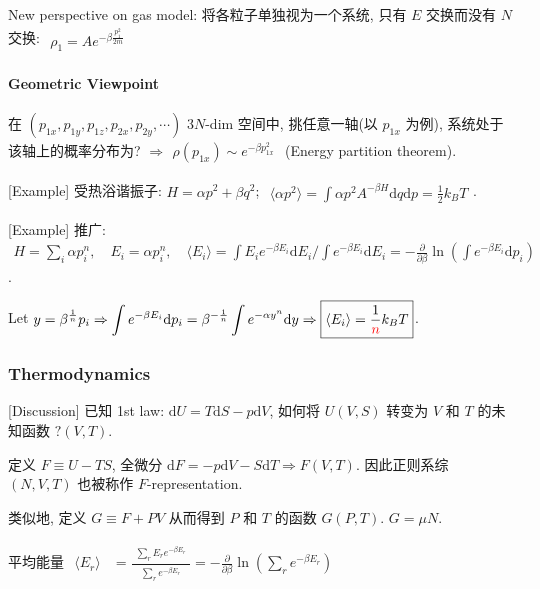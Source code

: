 \documentclass[../../main.tex]{subfiles}
\begin{document}
New perspective on gas model: 将各粒子单独视为一个系统, 只有 $E$ 交换而没有 $N$ 交换: $\begin{aligned}
    \rho_{1} = Ae^{-\beta\frac{p_{1}^{2}}{2m}}
\end{aligned}$
\paragraph{Geometric Viewpoint}
在 $(p_{1x},p_{1y},p_{1z},p_{2x},p_{2y},\cdots)$ $3N$-dim 空间中, 挑任意一轴(以 $p_{1x}$ 为例), 系统处于该轴上的概率分布为? $\Rightarrow\begin{aligned}
    \rho(p_{1x}) \sim e^{-\beta p_{1x}^{2}}
\end{aligned}$ (Energy partition theorem). 

[Example] 受热浴谐振子: $H = \alpha p^{2} + \beta q^{2}$; $\begin{aligned}
    \langle\alpha p^{2}\rangle = \int\alpha p^{2}A^{-\beta H}\mathrm{d}q\mathrm{d}p = \frac{1}{2}k_{B}T
\end{aligned}$. 

[Example] 推广: $\begin{aligned}
    H = \sum_{i}\alpha p_{i}^{n},\quad E_{i} = \alpha p_{i}^{n},\quad \langle E_{i}\rangle = \int E_{i}e^{-\beta E_{i}}\mathrm{d}E_{i} \bigg/ \int e^{-\beta E_{i}}\mathrm{d}E_{i} = -\frac{\partial}{\partial \beta}\ln{\left(\int e^{-\beta E_{i}}\mathrm{d}p_{i}\right)}
\end{aligned}$. 

Let $\begin{aligned}
    y = \beta^{\frac{1}{n}}p_{i}\Rightarrow\int e^{-\beta E_{i}}\mathrm{d}p_{i} = \beta^{-\frac{1}{n}}\int e^{-\alpha y^{n}}\mathrm{d}y\Rightarrow\boxed{\langle E_{i}\rangle = \frac{1}{{\color{red}{n}}}k_{B}T}
\end{aligned}$. 

\subsubsection{Thermodynamics}
[Discussion] 已知 1st law: $\mathrm{d}U = T\mathrm{d}S - p\mathrm{d}V$, 如何将 $U(V,S)$ 转变为 $V$ 和 $T$ 的未知函数 $?(V,T)$. 

定义 $F\equiv U - TS$, 全微分 $\mathrm{d}F = -p\mathrm{d}V-S\mathrm{d}T\Rightarrow F(V,T)$. 因此正则系综 $(N,V,T)$ 也被称作 $F$-representation. 

类似地, 定义 $G\equiv F+PV$ 从而得到 $P$ 和 $T$ 的函数 $G(P,T)$. $G=\mu N$.

平均能量 $\begin{aligned}
    \langle E_{r}\rangle &= \frac{\begin{aligned}
        \sum_{r}E_{r}e^{-\beta E_{r}}
    \end{aligned}}{\begin{aligned}
        \sum_{r}e^{-\beta E_{r}}
    \end{aligned}} = -\frac{\partial}{\partial\beta}\ln{\left(\sum_{r}e^{-\beta E_{r}}\right)}
\end{aligned}$
\end{document}
